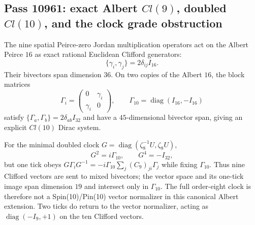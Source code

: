 \subsection{Pass 10961: exact Albert $Cl(9)$, doubled $Cl(10)$, and the clock grade obstruction}

The nine spatial Peirce-zero Jordan multiplication operators act on the
Albert Peirce $16$ as exact rational Euclidean Clifford generators:
\[
\{\gamma_i,\gamma_j\}=2\delta_{ij}I_{16}.
\]
Their bivectors span dimension $36$.  On two copies of the Albert $16$,
the block matrices
\[
\Gamma_i=\begin{pmatrix}0&\gamma_i\\\gamma_i&0\end{pmatrix},
\qquad
\Gamma_{10}=\operatorname{diag}(I_{16},-I_{16})
\]
satisfy $\{\Gamma_a,\Gamma_b\}=2\delta_{ab}I_{32}$ and have a
$45$-dimensional bivector span, giving an explicit $Cl(10)$ Dirac system.

For the minimal doubled clock
$G=\operatorname{diag}(\zeta_8^{-1}U,\zeta_8U)$,
\[
G^2=i\Gamma_{10},\qquad G^4=-I_{32},
\]
but one tick obeys
$G\Gamma_iG^{-1}=-i\Gamma_{10}\sum_j(C_9)_{ji}\Gamma_j$ while fixing
$\Gamma_{10}$.  Thus nine Clifford vectors are sent to mixed bivectors;
the vector space and its one-tick image span dimension $19$ and intersect
only in $\Gamma_{10}$.  The full order-eight clock is therefore not a
Spin(10)/Pin(10) vector normalizer in this canonical Albert extension.
Two ticks do return to the vector normalizer, acting as
$\operatorname{diag}(-I_9,+1)$ on the ten Clifford vectors.
